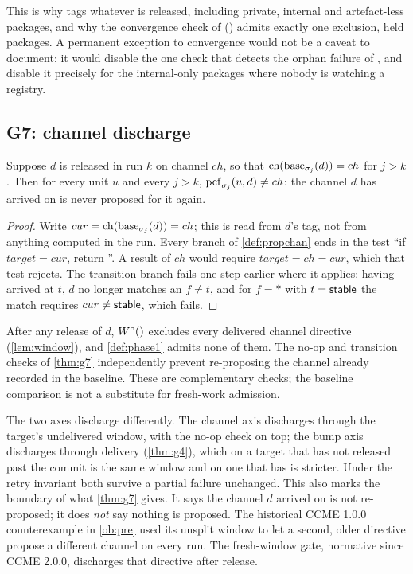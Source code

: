 This is why  tags whatever is released, including private,
internal and artefact-less packages, and why the convergence check of
 () admits exactly one exclusion, held packages. A
permanent exception to convergence would not be a caveat to document; it would
disable the one check that detects the orphan failure of , and
disable it precisely for the internal-only packages where nobody is watching a
registry.

\subsection{G7: channel discharge}

\begin{theorem}
\label{thm:g7}
Suppose $d$ is released in run $k$ on channel $ch$, so that
$\mathrm{ch}(\mathrm{base}_{\sigma_j}(d)) = ch$ for $j > k$. Then for every unit $u$ and every
$j > k$, $\mathrm{pcf}_{\sigma_j}(u,d) \neq ch$: the channel $d$ has arrived on is
never proposed for it again.
\end{theorem}

\begin{proof}
Write $cur = \mathrm{ch}(\mathrm{base}_{\sigma_j}(d)) = ch$; this is read from $d$'s tag, not
from anything computed in the run. Every branch of \cref{def:propchan} ends in
the test ``if $target = cur$, return \NONE''. A result of $ch$ would require
$target = ch = cur$, which that test rejects. The transition branch fails one
step earlier where it applies: having arrived at $t$, $d$ no longer matches an
$f \neq t$, and for $f = *$ with $t = \mathsf{stable}$ the match requires
$cur \neq \mathsf{stable}$, which fails.
\end{proof}

\begin{corollary}
\label{cor:g7}
After any release of $d$, $\Winf{}$ excludes every delivered channel
directive (\cref{lem:window}), and \cref{def:phase1} admits none of them. The
no-op and transition checks of \cref{thm:g7} independently prevent
re-proposing the channel already recorded in the baseline. These are
complementary checks; the baseline comparison is not a substitute for
fresh-work admission.
\end{corollary}

The two axes discharge differently. The channel axis discharges through the
target's undelivered window, with the no-op check on top; the bump axis
discharges through delivery (\cref{thm:g4}), which on a target that has not
released past the commit is the same window and on one that has is stricter.
Under the retry invariant both survive a partial failure unchanged. This also
marks the boundary of what \cref{thm:g7} gives. It says the channel $d$
arrived on is not re-proposed; it does \emph{not} say nothing is proposed. The
historical CCME 1.0.0 counterexample in \cref{ob:pre} used its unsplit window
to let a second, older directive propose a different channel on every run. The
fresh-window gate, normative since CCME 2.0.0, discharges that directive after
release.

